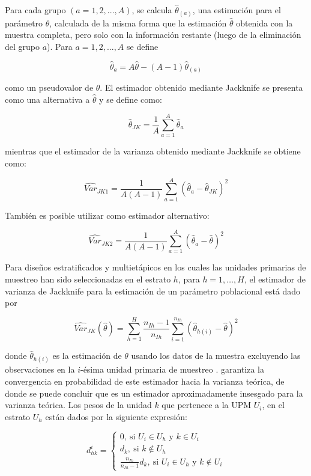 \documentclass[
  12pt,
  spanish,
]{book}
\begin{document}
Para cada grupo \((a=1,2,...,A)\), se calcula \(\hat{\theta}_{(a)}\), una estimación para el parámetro \(\theta\), calculada de la misma forma que la estimación \(\hat{\theta}\) obtenida con la muestra completa, pero solo con la información restante (luego de la eliminación del grupo \(a\)). Para \(a=1,2,...,A\) se define

\[\hat{\theta}_{a}=A\hat{\theta}-(A-1)\hat{\theta}_{(a)}\]

como un pseudovalor de \(\theta\). El estimador obtenido mediante Jackknife se presenta como una alternativa a \(\hat{\theta}\) y se define como:

\[\hat{\theta}_{JK}=\dfrac{1}{A}\sum_{a=1}^{A}\hat{\theta}_{a}\]

mientras que el estimador de la varianza obtenido mediante Jackknife se obtiene como:

\[\widehat{Var}_{JK1}=\dfrac{1}{A(A-1)}\sum_{a=1}^{A}\left(\hat{\theta}_{a}-\hat{\theta}_{JK}\right)^{2}\]

También es posible utilizar como estimador alternativo:

\[\widehat{Var}_{JK2}=\dfrac{1}{A(A-1)}\sum_{a=1}^{A}\left(\hat{\theta}_{a}-\hat{\theta}\right)^{2}\]

Para diseños estratificados y multietápicos en los cuales las unidades primarias de muestreo han sido seleccionadas en el estrato \(h\), para \(h=1, \ldots, H\), el estimador de varianza de Jackknife para la estimación de un parámetro poblacional está dado por

\[ 
\widehat{Var}_{JK}(\hat{\theta}) = \sum_{h=1}^H \frac{n_{Ih} - 1}{n_{Ih}} \sum_{i=1}^{n_{Ih}}
(\hat{\theta}_{h(i)}-\hat{\theta})^2
\]

donde \(\hat{\theta}_{h(i)}\) es la estimación de \(\theta\) usando los datos de la muestra excluyendo las observaciones en la \(i\)-ésima unidad primaria de muestreo \citep[pg. 29 -- 30]{Korn_Graubard_1999}. \citet[Teorema 6.2]{shao2012jackknife} garantiza la convergencia en probabilidad de este estimador hacia la varianza teórica, de donde se puede concluir que es un estimador aproximadamente insesgado para la varianza teórica. Los pesos de la unidad \(k\) que pertenece a la UPM \(U_i\), en el estrato \(U_h\) están dados por la siguiente expresión:

\[
d_{hk}^i = 
\begin{cases}
0, \ \text{si $U_i \in U_h$ y $k \in U_i$ }\\
d_k, \ \text{si $k \notin U_h$}\\
\frac{n_{Ih}}{n_{Ih}-1}d_k, \ \text{si $U_i \in U_h$ y $k \notin U_i$}
\end{cases}
\]
\end{document}
